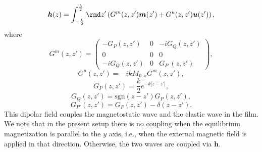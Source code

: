 \documentclass[10pt]{iopart}
\begin{document}
\begin{equation}
    \bm{h}(z)=\int_{-\frac{L}{2}}^{\frac{L}{2}}\rmd z'\left(G^m(z,z')\bm{m}(z')+G^u(z,z')\bm{u}(z')\right),\label{eq:dipolar_field}
\end{equation}
where
\begin{equation}
    G^m(z,z')=\left(\begin{array}{ccc}
        -G_P(z,z')&0&-iG_Q(z,z')\\
        0&0&0\\
        -iG_Q(z,z')&0&G_{P'}(z,z')
    \end{array}\right),
\end{equation}
\begin{equation*}
    G^u(z,z')=-ikM_{0,x}G^m(z,z'),
\end{equation*}
\begin{equation}
    G_{P}(z,z')=\frac{k}{2}e^{-k|z-z'|},
\end{equation}
\begin{equation}
    G_{Q}(z,z')=\mathrm{sgn}(z-z')G_{P}(z,z'),
\end{equation}
\begin{equation}
    G_{P'}(z,z')=G_{P}(z,z')-\delta(z-z').
\end{equation}
This dipolar field couples the magnetostatic wave and the elastic wave in the film. We note that in the present setup there is no coupling when the equilibrium magnetization is parallel to the $y$ axis, i.e., when the external magnetic field is applied in that direction. Otherwise, the two waves are coupled via $\bm{h}$.
\end{document}
